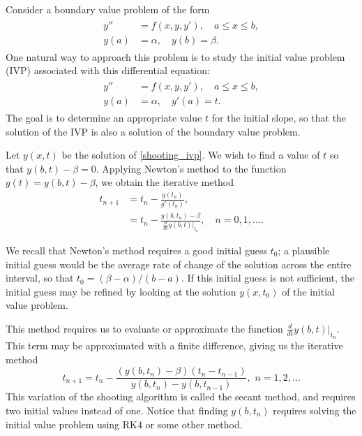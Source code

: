 \label{lab:Shooting}

Consider a boundary value problem of the form
\begin{align}
	\label{shooting_bvp}
	\begin{split}
y'' &= f(x,y,y'), \quad a \leq x \leq b, \\
y(a) &= \alpha, \quad y(b) = \beta.
\end{split}
\end{align}
One natural way to approach this problem is to study the initial value problem (IVP) associated with this differential equation:
\begin{align}
	\label{shooting_ivp}
	\begin{split}
y'' &= f(x,y,y'), \quad a \leq x \leq b, \\
y(a) &= \alpha, \quad y'(a) = t.
	\end{split}
\end{align}
The goal is to determine an  appropriate value $t$ for the initial slope, so that the solution of the IVP is also a solution of the boundary value problem.

Let $y(x,t)$ be the solution of \eqref{shooting_ivp}. We wish to find a value of $t$ so that
$y(b,t) - \beta = 0$.
Applying Newton's method to the function $g(t) = y(b,t) - \beta$, we obtain the iterative method
\begin{align*}
	t_{n+1} &= t_n - \frac{ g(t_n)}{g'(t_n) }, \\
	&= t_n - \frac{ y(b,t_n) - \beta}{\frac{d}{dt} \left.y(b,t)\right|_{t_n} },\quad n = 0,1,\ldots .
\end{align*}

We recall that Newton's method requires a good initial guess $t_0$; a plausible initial guess would be the average rate of change of the solution across the entire interval, so that $t_0 =  (\beta - \alpha)/(b-a)$.
If this initial guess is not sufficient, the initial guess may be refined by looking at the solution $y(x,t_0)$ of the initial value problem.

This method requires us to evaluate or approximate the function $\frac{d}{dt} \left.y(b,t)\right|_{t_n}$.
This term may be approximated with a finite difference, giving us the iterative method
\[t_{n+1} = t_n - \frac{ (y(b,t_n) - \beta)(t_n - t_{n-1})}{y(b,t_n) - y(b,t_{n-1}) }, \,\, n = 1, 2,\hdots\]
This variation of the shooting algorithm is called the secant method, and requires two initial values instead of one.
Notice that finding $y(b,t_n)$ requires solving the initial value problem using RK4 or some other method.

